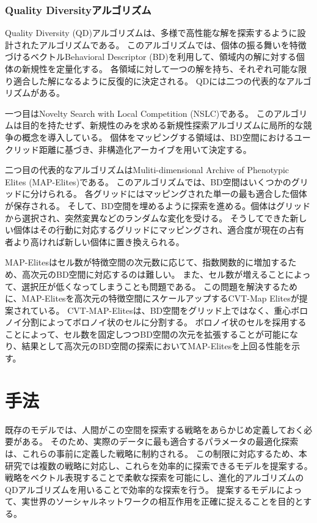 \documentclass[uplatex,11pt,openany]{ujreport}
\begin{document}
        \subsection{Quality Diversityアルゴリズム}
        Quality Diversity (QD)アルゴリズムは、多様で高性能な解を探索するように設計されたアルゴリズムである\cite{pughQualityDiversityNew2016}。
        このアルゴリズムでは、個体の振る舞いを特徴づけるベクトルBehavioral Descriptor (BD)を利用して、領域内の解に対する個体の新規性を定量化する。
        各領域に対して一つの解を持ち、それぞれ可能な限り適合した解になるように反復的に決定される。
        QDには二つの代表的なアルゴリズムがある。

        一つ目はNovelty Search with Local Competition (NSLC)\cite{lehmanEvolvingDiversityVirtual2011}である。
        このアルゴリムは目的を持たせず、新規性のみを求める新規性探索アルゴリズム\cite{lehman_NoveltySearchProblemObjectives_2011}に局所的な競争の概念を導入している。
        個体をマッピングする領域は、BD空間におけるユークリッド距離に基づき、非構造化アーカイブを用いて決定する。

        二つ目の代表的なアルゴリズムはMuliti-dimensional Archive of Phenotypic Elites (MAP-Elites)\cite{mouretIlluminatingSearchSpaces2015}である。
        このアルゴリズムでは、BD空間はいくつかのグリッドに分けられる。
        各グリッドにはマッピングされた単一の最も適合した個体が保存される。
        そして、BD空間を埋めるように探索を進める。個体はグリッドから選択され、突然変異などのランダムな変化を受ける。
        そうしてできた新しい個体はその行動に対応するグリッドにマッピングされ、適合度が現在の占有者より高ければ新しい個体に置き換えられる。

        MAP-Elitesはセル数が特徴空間の次元数に応じて、指数関数的に増加するため、高次元のBD空間に対応するのは難しい。
        また、セル数が増えることによって、選択圧が低くなってしまうことも問題である。
        この問題を解決するために、MAP-Elitesを高次元の特徴空間にスケールアップするCVT-Map Elites\cite{vassiliadesUsingCentroidalVoronoi2017}が提案されている。
        CVT-MAP-Elitesは、BD空間をグリッド上ではなく、重心ボロノイ分割によってボロノイ状のセルに分割する。
        ボロノイ状のセルを採用することによって、セル数を固定しつつBD空間の次元を拡張することが可能になり、結果として高次元のBD空間の探索においてMAP-Elitesを上回る性能を示す。


\chapter{手法}
    既存のモデルでは、人間がこの空間を探索する戦略をあらかじめ定義しておく必要がある。
    そのため、実際のデータに最も適合するパラメータの最適化探索は、これらの事前に定義した戦略に制約される\cite{sudaExplorationExploitationAdjacent2022, sudaAgentbasedModelUsing2022,ubaldiEmergenceEvolutionSocial2021}。
    この制限に対応するため、本研究では複数の戦略に対応し、これらを効率的に探索できるモデルを提案する。
    戦略をベクトル表現することで柔軟な探索を可能にし、進化的アルゴリズムの QDアルゴリズムを用いることで効率的な探索を行う。
    提案するモデルによって、実世界のソーシャルネットワークの相互作用を正確に捉えることを目的とする。
\end{document}
